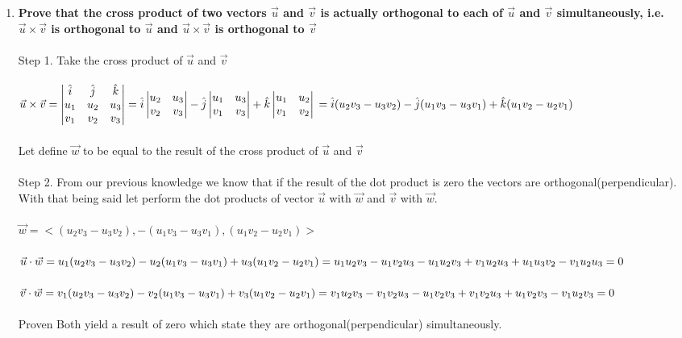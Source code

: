\documentclass{article}
\begin{document}
\begin{enumerate}[3]
\item\textbf{Prove that the cross product of two vectors $\vec{u}$ and $\vec{v}$ is actually orthogonal to each of $\vec{u}$ and $\vec{v}$ simultaneously, i.e. $\vec{u}\times\vec{v}$ is orthogonal to $\vec{u}$ and $\vec{u}\times\vec{v}$ is
orthogonal to $\vec{v}$ }
\\
\\
Step 1. Take the cross product of $\vec{u}$ and $\vec{v}$\\
\\
$\vec{u}\times\vec{v}=\begin{vmatrix}
\hat{i}&\hat{j}&\hat{k}\\
u_{1}&u_{2}&u_{3}\\
v_{1}&v_{2}&v_{3}\\
\end{vmatrix}=\hat{i}
\begin{vmatrix}
u_{2}&u_{3}\\
v_{2}&v_{3}\\
\end{vmatrix}-\hat{j}\begin{vmatrix}
u_{1}&u_{3}\\
v_{1}&v_{3}\\
\end{vmatrix}+\hat{k}\begin{vmatrix}
u_{1}&u_{2}\\
v_{1}&v_{2}\\
\end{vmatrix}\\
=\hat{i}(u_{2}v_{3}-u_{3}v_{2})-\hat{j}(u_{1}v_{3}-u_{3}v_{1})+\hat{k}(u_{1}v_{2}-u_{2}v_{1})$\\
\\
Let define $\vec{w}$ to be equal to the result of the cross product of $\vec{u}$ and $\vec{v}$\\
\\
Step 2. From our previous knowledge we know that if the result of the dot product is zero the vectors are orthogonal(perpendicular). With that being said let perform the dot products of vector $\vec{u}$ with $\vec{w}$ and $\vec{v}$ with $\vec{w}$.\\
\\
$\vec{w} = <(u_{2}v_{3}-u_{3}v_{2}),-(u_{1}v_{3}-u_{3}v_{1}),(u_{1}v_{2}-u_{2}v_{1})>$\\
\\
$\vec{u}\cdot\vec{w}=u_{1}(u_{2}v_{3}-u_{3}v_{2})-u_{2}(u_{1}v_{3}-u_{3}v_{1})+u_{3}(u_{1}v_{2}-u_{2}v_{1})\\=u_{1}u_{2}v_{3}-u_{1}v_{2}u_{3}-u_{1}u_{2}v_{3}+v_{1}u_{2}u_{3}+u_{1}u_{3}v_{2}-v_{1}u_{2}u_{3}=0$\\
\\ 
$\vec{v}\cdot\vec{w}=v_{1}(u_{2}v_{3}-u_{3}v_{2})-v_{2}(u_{1}v_{3}-u_{3}v_{1})+v_{3}(u_{1}v_{2}-u_{2}v_{1})\\=v_{1}u_{2}v_{3}-v_{1}v_{2}u_{3}-u_{1}v_{2}v_{3}+v_{1}v_{2}u_{3}+u_{1}v_{2}v_{3}-v_{1}u_{2}v_{3}=0$\\
\\
Proven Both yield a result of zero which state they are orthogonal(perpendicular) simultaneously.
\end{enumerate}
\end{document}
